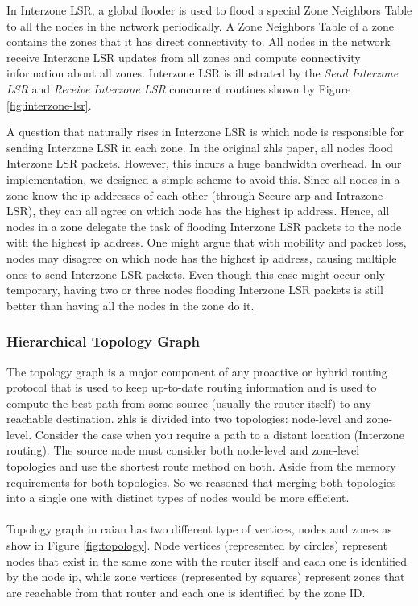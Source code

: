 In Interzone LSR, a global flooder is used to flood a special Zone Neighbors Table to all the nodes in the network periodically. A Zone Neighbors Table of a zone contains the zones that it has direct connectivity to. All nodes in the network receive Interzone LSR updates from all zones and compute connectivity information about all zones.  Interzone LSR is illustrated by the \textit{Send Interzone LSR} and \textit{Receive Interzone LSR} concurrent routines shown by Figure \ref{fig:interzone-lsr}.

A question that naturally rises in Interzone LSR is which node is responsible for sending Interzone LSR in each zone. In the original \acrshort{zhls} paper, all nodes flood Interzone LSR packets. However, this incurs a huge bandwidth overhead. In our implementation, we designed a simple scheme to avoid this. Since all nodes in a zone know the \acrshort{ip} addresses of each other (through Secure \acrshort{arp} and Intrazone LSR), they can all agree on which node has the highest \acrshort{ip} address. Hence, all nodes in a zone delegate the task of flooding Interzone LSR packets to the node with the highest \acrshort{ip} address. One might argue that with mobility and packet loss, nodes may disagree on which node has the highest \acrshort{ip} address, causing multiple ones to send Interzone LSR packets. Even though this case might occur only temporary, having two or three nodes flooding Interzone LSR packets is still better than having all the nodes in the zone do it.


\subsubsection{Hierarchical Topology Graph}
\qquad The topology graph is a major component of any proactive or hybrid routing protocol that is used to keep up-to-date routing information and is used to compute the best path from some source (usually the router itself) to any reachable destination. \acrfull{zhls} is divided into two topologies: node-level and zone-level. Consider the case when you require a path to a distant location (Interzone routing). The source node must consider both node-level and zone-level topologies and use the shortest route method on both. Aside from the memory requirements for both topologies. So we reasoned that merging both topologies into a single one with distinct types of nodes would be more efficient.\\ \\
Topology graph in \acrshort{caian} has two different type of vertices, nodes and zones as show in Figure \ref{fig:topology}. Node vertices (represented by circles) represent nodes that exist in the same zone with the router itself and each one is identified by the node \acrshort{ip}, while zone vertices (represented by squares) represent zones that are reachable from that router and each one is identified by the zone ID. 

